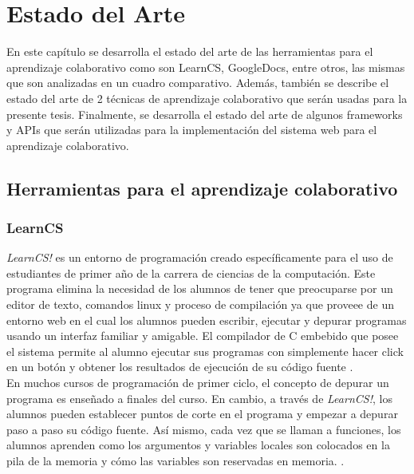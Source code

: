 \chapter{Estado del Arte}
\label{cap:estado_del_arte}
En este capítulo se desarrolla el estado del arte de las herramientas para el aprendizaje colaborativo como son LearnCS, GoogleDocs, entre otros, las mismas que son analizadas en un cuadro comparativo. Además, también se describe el estado del arte de 2 técnicas de aprendizaje colaborativo que serán usadas para la presente tesis. Finalmente, se desarrolla el estado del arte de algunos frameworks y APIs que serán utilizadas para la implementación del sistema web para el aprendizaje colaborativo.

\section{Herramientas para el aprendizaje colaborativo}

\subsection{LearnCS}
\emph{LearnCS!} es un entorno de programación creado específicamente para el uso de estudiantes de primer año de la carrera de ciencias de la computación. Este programa elimina la necesidad de los alumnos de tener que preocuparse por un editor de texto, comandos linux y proceso de compilación ya que proveee de un entorno web en el cual los alumnos pueden escribir, ejecutar y depurar programas usando un interfaz familiar y amigable. El compilador de C embebido que posee el sistema permite al alumno ejecutar sus programas con simplemente hacer click en un botón y obtener los resultados de ejecución de su código fuente \cite{lipman_learncs_2014}.\\

En muchos cursos de programación de primer ciclo, el concepto de depurar un programa es enseñado a finales del curso. En cambio, a través de \emph{LearnCS!}, los alumnos pueden establecer puntos de corte en el programa y empezar a depurar paso a paso su código fuente. Así mismo, cada vez que se llaman a funciones, los alumnos aprenden como los argumentos y variables locales son colocados en la pila de la memoria y cómo las variables son reservadas en memoria. \cite{lipman_learncs_2014}.\\

